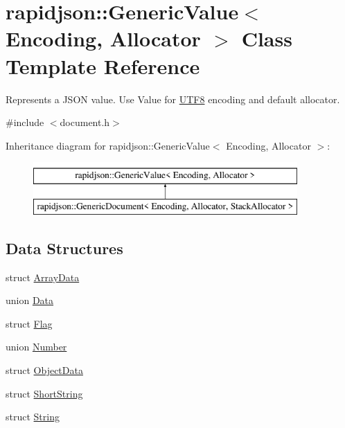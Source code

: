 \hypertarget{classrapidjson_1_1_generic_value}{}\section{rapidjson\+::Generic\+Value$<$ Encoding, Allocator $>$ Class Template Reference}
\label{classrapidjson_1_1_generic_value}


Represents a J\+S\+ON value. Use Value for \mbox{\hyperlink{structrapidjson_1_1_u_t_f8}{U\+T\+F8}} encoding and default allocator.  




{\ttfamily \#include $<$document.\+h$>$}

Inheritance diagram for rapidjson\+::Generic\+Value$<$ Encoding, Allocator $>$\+:\begin{figure}[H]
\begin{center}
\leavevmode
\includegraphics[height=2.000000cm]{classrapidjson_1_1_generic_value}
\end{center}
\end{figure}
\subsection*{Data Structures}
\begin{DoxyCompactItemize}
\item 
struct \mbox{\hyperlink{structrapidjson_1_1_generic_value_1_1_array_data}{Array\+Data}}
\item 
union \mbox{\hyperlink{unionrapidjson_1_1_generic_value_1_1_data}{Data}}
\item 
struct \mbox{\hyperlink{structrapidjson_1_1_generic_value_1_1_flag}{Flag}}
\item 
union \mbox{\hyperlink{unionrapidjson_1_1_generic_value_1_1_number}{Number}}
\item 
struct \mbox{\hyperlink{structrapidjson_1_1_generic_value_1_1_object_data}{Object\+Data}}
\item 
struct \mbox{\hyperlink{structrapidjson_1_1_generic_value_1_1_short_string}{Short\+String}}
\item 
struct \mbox{\hyperlink{structrapidjson_1_1_generic_value_1_1_string}{String}}
\end{DoxyCompactItemize}
